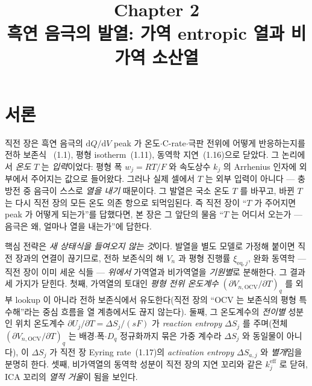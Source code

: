 \documentclass[11pt,a4paper]{article}
\title{\textbf{\LARGE Chapter 2}\\[0.35em]\Large 흑연 음극의 발열: 가역 entropic 열과 비가역 소산열}
\author{}
\date{}
\newcommand{\dd}{\mathrm{d}}
\newcommand{\eff}{\mathrm{eff}}
\newcommand{\eq}{\mathrm{eq}}
\newcommand{\OCV}{\mathrm{OCV}}
\begin{document}
\maketitle

\section*{서론}
직전 장은 흑연 음극의 $\dd Q/\dd V$ peak 가 온도$\cdot$C-rate$\cdot$극판 전위에 어떻게 반응하는지를 전하 보존식
~(1.1), 평형 isotherm~(1.11), 동역학 지연~(1.16)으로 닫았다. 그 논리에서 \emph{온도} $T$ 는 \emph{입력}이었다:
평형 폭 $w_j=RT/F$ 와 속도상수 $k_j$ 의 Arrhenius 인자에 외부에서 주어지는 값으로 들어왔다. 그러나 실제 셀에서
$T$ 는 외부 입력이 아니다 — 충방전 중 음극이 스스로 \emph{열을 내기} 때문이다. 그 발열은 국소 온도 $T$ 를 바꾸고,
바뀐 $T$ 는 다시 직전 장의 모든 온도 의존 항으로 되먹임된다. 즉 직전 장이 ``$T$ 가 주어지면 peak 가 어떻게
되는가''를 답했다면, 본 장은 그 앞단의 물음 ``$T$ 는 어디서 오는가 — 음극은 왜, 얼마나 열을 내는가''에 답한다.

핵심 전략은 \emph{새 상태식을 들여오지 않는 것}이다. 발열을 별도 모델로 가정해 붙이면 직전 장과의 연결이 끊기므로,
전하 보존식의 해 $V_n$ 과 평형 진행률 $\xi_{\eq,j}$, 완화 동역학 — 직전 장이 이미 세운 식들 — \emph{위에서} 가역열과
비가역열을 \emph{기원별}로 분해한다. 그 결과 세 가지가 닫힌다. 첫째, 가역열의 토대인 \emph{평형 전위 온도계수}
$(\partial V_{n,\OCV}/\partial T)_q$ 를 외부 lookup 이 아니라 전하 보존식에서 유도한다(직전 장의 ``OCV 는 보존식의
평형 특수해''라는 중심 흐름을 열 계층에서도 끊지 않는다). 둘째, 그 온도계수의 \emph{전이별} 성분인 위치 온도계수
$\partial U_j/\partial T=\Delta S_j/(sF)$ 가 \emph{reaction entropy} $\Delta S_j$ 를 주며(전체
$(\partial V_{n,\OCV}/\partial T)_q$ 는 배경$\cdot$폭$\cdot$$D_q$ 정규화까지 묶은 가중 계수라 $\Delta S_j$ 와
동일물이 아니다), 이 $\Delta S_j$ 가 직전 장 Eyring rate~(1.17)의 \emph{activation entropy} $\Delta S_{a,j}$ 와
\emph{별개}임을 분명히 한다. 셋째, 비가역열의 동역학 성분이 직전 장의 지연 꼬리와 같은 $k_j^{\eff}$ 로 닫혀, ICA
꼬리의 \emph{열적 거울}이 됨을 보인다.

\tableofcontents
\newpage

\end{document}
